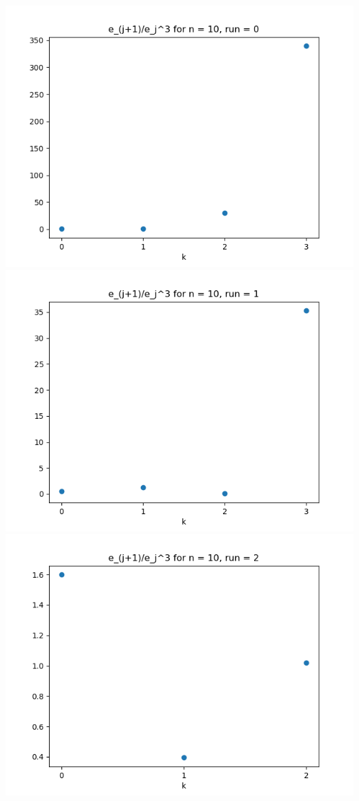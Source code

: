 \documentclass{article}
\begin{document}
\begin{enumerate}
\begin{enumerate}
		\begin{center}
			\includegraphics[scale=.4]{hw4 err n = 10 run = 0}
			\includegraphics[scale=.4]{hw4 err n = 10 run = 1}
			\includegraphics[scale=.4]{hw4 err n = 10 run = 2}

\end{center}
\end{enumerate}
\end{enumerate}
\end{document}
